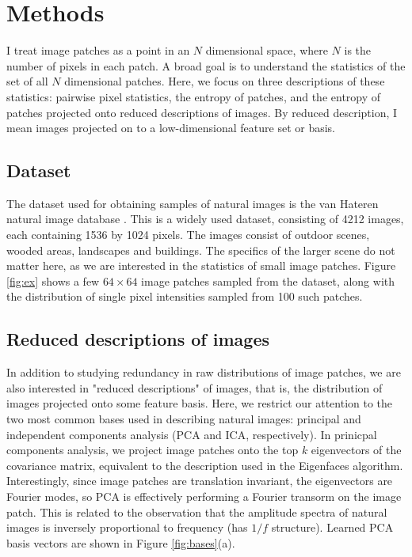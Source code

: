 \documentclass[10pt,twocolumn,letterpaper]{article}
\begin{document}
\section{Methods}
I treat image patches as a point in an $N$ dimensional space, where $N$ is the number of pixels in each patch.
A broad goal is to understand the statistics of the set of all $N$ dimensional patches.
Here, we focus on three descriptions of these statistics: pairwise pixel statistics, the entropy of patches, and the entropy of patches projected onto reduced descriptions of images.
By reduced description, I mean images projected on to a low-dimensional feature set or basis.

\subsection{Dataset}
The dataset used for obtaining samples of natural images is the van Hateren natural image database \cite{vanhateren}.
This is a widely used dataset, consisting of 4212 images, each containing 1536 by 1024 pixels. The images consist of outdoor scenes, wooded areas, landscapes and buildings. The specifics of the larger scene do not matter here, as we are interested in the statistics of small image patches. Figure \ref{fig:ex} shows a few $64\times 64$ image patches sampled from the dataset, along with the distribution of single pixel intensities sampled from 100 such patches.

\subsection{Reduced descriptions of images}
In addition to studying redundancy in raw distributions of image patches, we are also interested in "reduced descriptions" of images, that is, the distribution of images projected onto some feature basis. Here, we restrict our attention to the two most common bases used in describing natural images: principal and independent components analysis (PCA and ICA, respectively). In prinicpal components analysis, we project image patches onto the top $k$ eigenvectors of the covariance matrix, equivalent to the description used in the Eigenfaces algorithm. Interestingly, since image patches are translation invariant, the eigenvectors are Fourier modes, so PCA is effectively performing a Fourier transorm on the image patch. This is related to the observation that the amplitude spectra of natural images is inversely proportional to frequency (has $1/f$ structure). Learned PCA basis vectors are shown in Figure \ref{fig:bases}(a).
\end{document}
